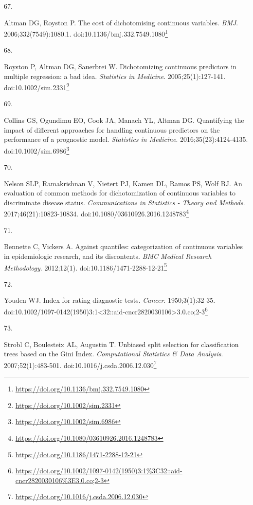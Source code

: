 \documentclass[
  a4paper,
]{book}
\newlength{\cslhangindent}
\newlength{\csllabelwidth}
\newlength{\cslentryspacingunit} %
\newenvironment{CSLReferences}[2] %
 {%
  \setlength{\parindent}{0pt}
  \ifodd #1
  \let\oldpar\par
  \def\par{\hangindent=\cslhangindent\oldpar}
  \fi
  \setlength{\parskip}{#2\cslentryspacingunit}
 }%
 {}
\newcommand{\CSLLeftMargin}[1]{\parbox[t]{\csllabelwidth}{#1}}
\newcommand{\CSLRightInline}[1]{\parbox[t]{\linewidth - \csllabelwidth}{#1}\break}
\renewcommand{\href}[2]{#2\footnote{\url{#1}}}
\begin{document}
\begin{CSLReferences}{0}{0}
\leavevmode{}%
\CSLLeftMargin{67. }%
\CSLRightInline{Altman DG, Royston P. The cost of dichotomising continuous variables. \emph{BMJ}. 2006;332(7549):1080.1. doi:\href{https://doi.org/10.1136/bmj.332.7549.1080}{10.1136/bmj.332.7549.1080}}

\leavevmode{}%
\CSLLeftMargin{68. }%
\CSLRightInline{Royston P, Altman DG, Sauerbrei W. Dichotomizing continuous predictors in multiple regression: a bad idea. \emph{Statistics in Medicine}. 2005;25(1):127-141. doi:\href{https://doi.org/10.1002/sim.2331}{10.1002/sim.2331}}

\leavevmode{}%
\CSLLeftMargin{69. }%
\CSLRightInline{Collins GS, Ogundimu EO, Cook JA, Manach YL, Altman DG. Quantifying the impact of different approaches for handling continuous predictors on the performance of a prognostic model. \emph{Statistics in Medicine}. 2016;35(23):4124-4135. doi:\href{https://doi.org/10.1002/sim.6986}{10.1002/sim.6986}}

\leavevmode{}%
\CSLLeftMargin{70. }%
\CSLRightInline{Nelson SLP, Ramakrishnan V, Nietert PJ, Kamen DL, Ramos PS, Wolf BJ. An evaluation of common methods for dichotomization of continuous variables to discriminate disease status. \emph{Communications in Statistics - Theory and Methods}. 2017;46(21):10823-10834. doi:\href{https://doi.org/10.1080/03610926.2016.1248783}{10.1080/03610926.2016.1248783}}

\leavevmode{}%
\CSLLeftMargin{71. }%
\CSLRightInline{Bennette C, Vickers A. Against quantiles: categorization of continuous variables in epidemiologic research, and its discontents. \emph{BMC Medical Research Methodology}. 2012;12(1). doi:\href{https://doi.org/10.1186/1471-2288-12-21}{10.1186/1471-2288-12-21}}

\leavevmode{}%
\CSLLeftMargin{72. }%
\CSLRightInline{Youden WJ. Index for rating diagnostic tests. \emph{Cancer}. 1950;3(1):32-35. doi:\href{https://doi.org/10.1002/1097-0142(1950)3:1\%3C32::aid-cncr2820030106\%3E3.0.co;2-3}{10.1002/1097-0142(1950)3:1\textless32::aid-cncr2820030106\textgreater3.0.co;2-3}}

\leavevmode{}%
\CSLLeftMargin{73. }%
\CSLRightInline{Strobl C, Boulesteix AL, Augustin T. Unbiased split selection for classification trees based on the Gini Index. \emph{Computational Statistics \& Data Analysis}. 2007;52(1):483-501. doi:\href{https://doi.org/10.1016/j.csda.2006.12.030}{10.1016/j.csda.2006.12.030}}


\end{CSLReferences}
\end{document}
